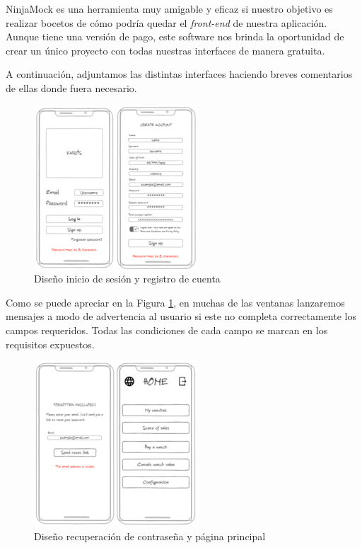 	NinjaMock es una herramienta muy amigable y eficaz si nuestro objetivo es realizar bocetos de cómo podría quedar el \emph{front-end} de nuestra aplicación. Aunque tiene una versión de pago, este software nos brinda la oportunidad de crear un único proyecto con todas nuestras interfaces de manera gratuita.
	
	A continuación, adjuntamos las distintas interfaces haciendo breves comentarios de ellas donde fuera necesario.
	
\begin{figure}[H]
    \centering
    \includegraphics[width=0.6\linewidth]{img/image1.png}
    \caption{Diseño inicio de sesión y registro de cuenta}
    \label{fig:image1}
\end{figure}

	Como se puede apreciar en la Figura \ref{fig:image1}, en muchas de las ventanas lanzaremos mensajes a modo de advertencia al usuario si este no completa correctamente los campos requeridos. Todas las condiciones de cada campo se marcan en los requisitos expuestos.
	
\begin{figure}[H]
    \centering
    \includegraphics[width=0.6\linewidth]{img/image2.png}
    \caption{Diseño recuperación de contraseña y página principal}
    \label{fig:image2}
\end{figure}
	
